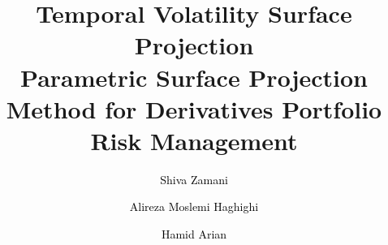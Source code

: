 \documentclass[a4paper,fleqn]{cas-dc}
\begin{document}
\let\WriteBookmarks\relax
\def\floatpagepagefraction{1}
\def\textpagefraction{.001}

\title[mode = title]{Temporal Volatility Surface Projection
\\[-1pt] {\Large Parametric Surface Projection Method for Derivatives Portfolio Risk Management}
\\[20pt]
}

\author[1]{ \textcolor{black}{Shiva Zamani}}

\author[2]{ \textcolor{black}{Alireza Moslemi Haghighi}}

\author[3]{ \textcolor{black}{Hamid Arian}}

\address[1]{Sharif University of Technology, Teymoori Sq, Tehran, Iran 1459973941}
\address[3]{York University, 4700 Keele St, Toronto, Ontario, Canada M3J 1P3}


\end{document}
